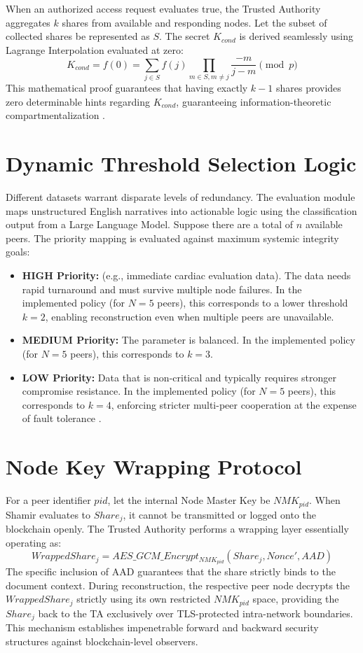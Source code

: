 When an authorized access request evaluates true, the Trusted Authority aggregates $k$ shares from available and responding nodes. Let the subset of collected shares be represented as $S$. The secret $K_{cond}$ is derived seamlessly using Lagrange Interpolation evaluated at zero:
\begin{equation}
K_{cond} = f(0) = \sum_{j \in S} f(j) \prod_{m \in S, m \neq j} \frac{-m}{j-m} \pmod p
\end{equation}
This mathematical proof guarantees that having exactly $k-1$ shares provides zero determinable hints regarding $K_{cond}$, guaranteeing information-theoretic compartmentalization \cite{li2023privacy}.

\section{Dynamic Threshold Selection Logic}
Different datasets warrant disparate levels of redundancy. The evaluation module maps unstructured English narratives into actionable logic using the classification output from a Large Language Model. Suppose there are a total of $n$ available peers. The priority mapping is evaluated against maximum systemic integrity goals:
\begin{itemize}
    \item \textbf{HIGH Priority:} (e.g., immediate cardiac evaluation data). The data needs rapid turnaround and must survive multiple node failures. In the implemented policy (for $N=5$ peers), this corresponds to a lower threshold $k=2$, enabling reconstruction even when multiple peers are unavailable.
    \item \textbf{MEDIUM Priority:} The parameter is balanced. In the implemented policy (for $N=5$ peers), this corresponds to $k=3$.
    \item \textbf{LOW Priority:} Data that is non-critical and typically requires stronger compromise resistance. In the implemented policy (for $N=5$ peers), this corresponds to $k=4$, enforcing stricter multi-peer cooperation at the expense of fault tolerance \cite{bhandari2016priority}.
\end{itemize}

\section{Node Key Wrapping Protocol}
For a peer identifier $pid$, let the internal Node Master Key be $NMK_{pid}$. When Shamir evaluates to $Share_j$, it cannot be transmitted or logged onto the blockchain openly. The Trusted Authority performs a wrapping layer essentially operating as:
\begin{equation}
WrappedShare_j = AES\_GCM\_Encrypt_{NMK_{pid}}(Share_j, Nonce', AAD)
\end{equation}
The specific inclusion of AAD guarantees that the share strictly binds to the document context. During reconstruction, the respective peer node decrypts the $WrappedShare_j$ strictly using its own restricted $NMK_{pid}$ space, providing the $Share_j$ back to the TA exclusively over TLS-protected intra-network boundaries. This mechanism establishes impenetrable forward and backward security structures against blockchain-level observers.
